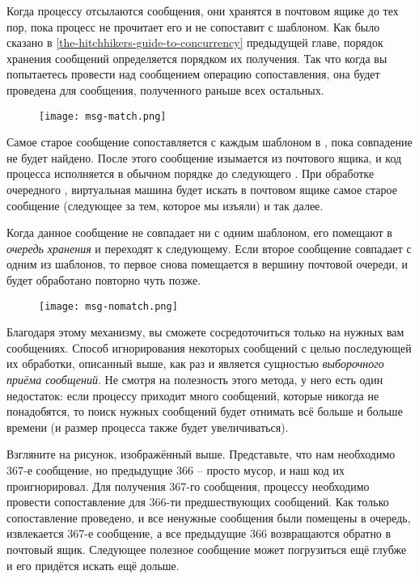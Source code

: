 Когда процессу отсылаются сообщения, они хранятся в почтовом ящике до тех пор, пока процесс не прочитает его и не сопоставит с шаблоном.
Как было сказано в \ref{the-hitchhikers-guide-to-concurrency} предыдущей главе, порядок хранения сообщений определяется  порядком их получения.
Так что когда вы попытаетесь провести над сообщением операцию сопоставления, она будет проведена для сообщения, полученного раньше всех остальных.
\begin{figure}[h!]
    \centering
    \texttt{[image: msg-match.png]}
\end{figure}

Самое старое сообщение сопоставляется с каждым шаблоном в , пока совпадение не будет найдено.
После этого сообщение изымается из почтового ящика, и код процесса исполняется в обычном порядке до следующего .
При обработке очередного , виртуальная машина будет искать в почтовом ящике самое старое сообщение (следующее за тем, которое мы изъяли) и так далее.

Когда данное сообщение не совпадает ни с одним шаблоном, его помещают в \emph{очередь хранения} и переходят к следующему.
Если второе сообщение совпадает с одним из шаблонов, то первое снова помещается в вершину почтовой очереди, и будет обработано повторно чуть позже.
\begin{figure}[h!]
    \centering
    \texttt{[image: msg-nomatch.png]}
\end{figure}

Благодаря этому механизму, вы сможете сосредоточиться только на нужных вам сообщениях.
Способ игнорирования некоторых сообщений с целью последующей их обработки, описанный выше, как раз и является сущностью \emph{выборочного приёма сообщений}.
Не смотря на полезность этого метода, у него есть один недостаток: если процессу приходит много сообщений, которые никогда не понадобятся, то поиск нужных сообщений будет отнимать всё больше и больше времени (и размер процесса также будет увеличиваться).

Взгляните на рисунок, изображённый выше.
Представьте, что нам необходимо 367\--е сообщение, но предыдущие 366 \--- просто мусор, и наш код их проигнорировал.
Для получения 367\--го сообщения, процессу необходимо провести сопоставление для 366\--ти предшествующих сообщений.
Как только сопоставление проведено, и все ненужные сообщения были помещены в очередь, извлекается 367\--е сообщение, а все предыдущие 366 возвращаются обратно в почтовый ящик.
Следующее полезное сообщение может погрузиться ещё глубже и его придётся искать ещё дольше.

